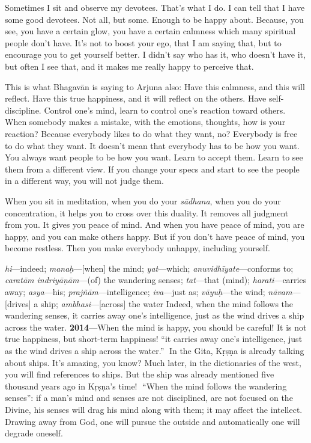Sometimes I sit and observe my devotees. That’s what I do. I can tell that I have some good devotees. Not all, but some. Enough to be happy about. Because, you see, you have a certain glow, you have a certain calmness which many spiritual people don’t have. It’s not to boost your ego,  that I am saying that, but to encourage you to get yourself better. I didn’t say who has it, who doesn’t have it, but often I see that, and it makes me really happy to perceive that.

This is what Bhagavān is saying to Arjuna also: Have this calmness, and this will reflect. Have this true happiness, and it will reflect on the others. Have self-discipline. Control one’s mind, learn to control one’s reaction toward others. When somebody makes a mistake, with the emotions, thoughts, how is your reaction? Because everybody likes to do what they want, no? Everybody is free to do what they want. It doesn’t mean that everybody has to be how you want. You always want people to be how you want. Learn to accept them. Learn to see them from a different view. If you change your specs and start to see the people in a different way, you will not judge them.

When you sit in meditation, when you do your \textit{sādhana}, when you do your concentration, it helps you to cross over this duality. It removes all judgment from you. It gives you peace of mind. And when you have peace of mind, you are happy, and you can make others happy. But if you don’t have peace of mind, you become restless. Then you make everybody unhappy, including yourself.

{%
  \textit{hi}---indeed; 
  \textit{manaḥ}---[when] the mind; 
  \textit{yat}---which; 
  \textit{anuvidhīyate}---conforms to; 
  \textit{caratām indriyāṇām}---(of) the wandering senses; 
  \textit{tat}---that (mind); 
  \textit{harati}---carries away; 
  \textit{asya}---his; 
  \textit{prajñām}---intelligence; 
  \textit{iva}---just as; 
  \textit{vāyuḥ}---the wind; 
  \textit{nāvam}---[drives] a ship; 
  \textit{ambhasi}---[across] the water
}
{%
  Indeed, when the mind follows the wandering senses, it carries away one’s intelligence, just as the wind drives a ship across the water.
}
\textbf{2014}---When the mind is happy, you should be careful! It is not true happiness, but short-term happiness! “it carries away one’s intelligence, just as the wind drives a ship across the water.” In the Gita, Kṛṣṇa is already talking about ships. It’s amazing, you know? Much later, in the dictionaries of the west, you will find references to ships. But the ship was already mentioned five thousand years ago in Kṛṣṇa’s time! “When the mind follows the wandering senses”: if a man’s mind and senses are not disciplined, are not focused on the Divine, his senses will drag his mind along with them; it may affect the intellect. Drawing away from God, one will pursue the outside and automatically one will degrade oneself.

